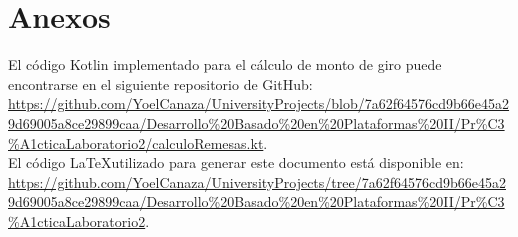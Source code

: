 \documentclass[11pt,a4paper]{article}
\begin{document}
\section{Anexos}

El código Kotlin implementado para el cálculo de monto de giro puede encontrarse en el siguiente repositorio de GitHub: 
\url{https://github.com/YoelCanaza/UniversityProjects/blob/7a62f64576cd9b66e45a29d69005a8ce29899caa/Desarrollo%20Basado%20en%20Plataformas%20II/Pr%C3%A1cticaLaboratorio2/calculoRemesas.kt}.
\\

El código \LaTeX utilizado para generar este documento está disponible en: 
\url{https://github.com/YoelCanaza/UniversityProjects/tree/7a62f64576cd9b66e45a29d69005a8ce29899caa/Desarrollo%20Basado%20en%20Plataformas%20II/Pr%C3%A1cticaLaboratorio2}.
\end{document}
